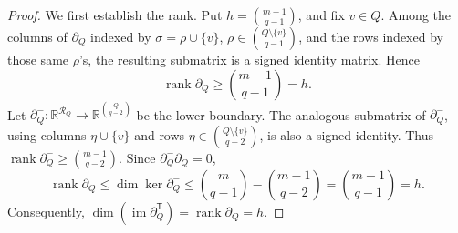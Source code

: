 \documentclass[11pt]{article}
\newcommand{\R}{\mathbb{R}}
\newcommand{\rank}{\operatorname{rank}}
\newcommand{\im}{\operatorname{im}}
\newcommand{\Ker}{\operatorname{ker}}
\newcommand{\bd}{\partial}
\newcommand{\calR}{\mathcal{R}}
\begin{document}
\begin{proof}
	We first establish the rank. Put \(h=\binom{m-1}{q-1}\), and fix \(v\in Q\). Among the columns of
	\(\bd_Q\) indexed by \(\sigma=\rho\cup\{v\}\),
	\(\rho\in\binom{Q\setminus\{v\}}{q-1}\), and the rows indexed by those
	same \(\rho\)'s, the resulting submatrix is a signed identity matrix.
	Hence
	\[
	\rank\bd_Q\ge\binom{m-1}{q-1}=h.
	\]
	Let \(\bd_Q^-:\R^{\calR_Q}\to\R^{\binom Q{q-2}}\) be the lower
	boundary. The analogous submatrix of \(\bd_Q^-\), using columns
	\(\eta\cup\{v\}\) and rows
	\(\eta\in\binom{Q\setminus\{v\}}{q-2}\), is also a signed identity.
	Thus \(\rank\bd_Q^-\ge\binom{m-1}{q-2}\). Since
	\(\bd_Q^-\bd_Q=0\),
	\[
	\rank\bd_Q
	\le\dim\Ker\bd_Q^-
	\le\binom m{q-1}-\binom{m-1}{q-2}
	=\binom{m-1}{q-1}=h.
	\]
	Consequently, \(\dim(\im\bd_Q^{\mathsf T}) = \rank\bd_Q = h\).
	

\end{proof}
\end{document}

